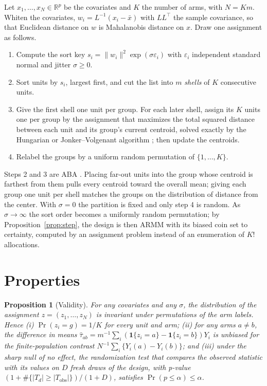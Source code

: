 \documentclass[11pt]{article}
\newtheorem{proposition}{Proposition}
\theoremstyle{remark}
\begin{document}
Let $x_1, \dots, x_N \in \mathbb{R}^p$ be the covariates and $K$ the number
of arms, with $N = Km$. Whiten the covariates, $w_i = L^{-1}(x_i - \bar x)$
with $LL^\top$ the sample covariance, so that Euclidean distance on $w$ is
Mahalanobis distance on $x$. Draw one assignment as follows.
\begin{enumerate}
\item Compute the sort key $s_i = \|w_i\|^2 \exp(\sigma \varepsilon_i)$ with
  $\varepsilon_i$ independent standard normal and jitter $\sigma \ge 0$.
\item Sort units by $s_i$, largest first, and cut the list into $m$
  \emph{shells} of $K$ consecutive units.
\item Give the first shell one unit per group. For each later shell, assign
  its $K$ units one per group by the assignment that maximizes the total
  squared distance between each unit and its group's current centroid,
  solved exactly by the Hungarian or Jonker--Volgenant algorithm
  \citep{jonker1987}; then update the centroids.
\item Relabel the groups by a uniform random permutation of $\{1, \dots, K\}$.
\end{enumerate}
Steps 2 and 3 are ABA \citep{baumann2026}. Placing far-out units into the
group whose centroid is farthest from them pulls every centroid toward the
overall mean; giving each group one unit per shell matches the groups on the
distribution of distance from the center. With $\sigma = 0$ the partition is
fixed and only step 4 is random. As $\sigma \to \infty$ the sort order
becomes a uniformly random permutation; by
Proposition~\ref{prop:step}, the design is then ARMM \citep{yang2023} with its
biased coin set to certainty, computed by an assignment problem instead of an
enumeration of $K!$ allocations.

\section{Properties}\label{sec:theory}

\begin{proposition}[Validity]\label{prop:valid}
For any covariates and any $\sigma$, the distribution of the assignment
$z = (z_1, \dots, z_N)$ is invariant under permutations of the arm labels.
Hence (i) $\Pr(z_i = g) = 1/K$ for every unit and arm; (ii) for any arms $a
\ne b$, the difference in means $\hat\tau_{ab} = m^{-1}\sum_i
(\mathbf{1}\{z_i = a\} - \mathbf{1}\{z_i = b\}) Y_i$ is unbiased for the
finite-population contrast $N^{-1}\sum_i \{Y_i(a) - Y_i(b)\}$; and (iii)
under the sharp null of no effect, the randomization test that compares the
observed statistic with its values on $D$ fresh draws of the design, with
p-value $(1 + \#\{|T_d| \ge |T_{\mathrm{obs}}|\})/(1 + D)$, satisfies
$\Pr(p \le \alpha) \le \alpha$.
\end{proposition}
\end{document}
